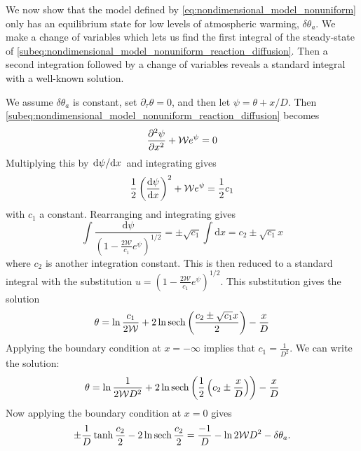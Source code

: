 We now show that the model defined by \cref{eq:nondimensional_model_nonuniform} only has an equilibrium state for low levels of atmospheric warming, $\delta\theta_a$.
We make a change of variables which lets us find the first integral of the steady-state of 
\cref{subeq:nondimensional_model_nonuniform_reaction_diffusion}. Then a second integration followed by a change of variables reveals a standard integral with a
well-known solution.

We assume $\delta\theta_a$ is constant, set $\partial_{\tau}\theta = 0$, and then let $\psi = \theta + x/D$. Then \cref{subeq:nondimensional_model_nonuniform_reaction_diffusion} becomes
\begin{equation}
  \pdv[2]{\psi}{x} + \mathcal{W}e^{\psi} = 0
\end{equation}
Multiplying this by $\dv*{\psi}{x}$ and integrating gives
\begin{equation}
  \frac{1}{2} \left(\dv{\psi}{x}\right)^2 + \mathcal{W}e^{\psi} = \frac{1}{2} c_1
\end{equation}
with $c_1$ a constant.
Rearranging and integrating gives
\begin{equation}
  \int \frac{\mathrm{d}\psi}{\left( 1 - \frac{2\mathcal{W}}{c_1} e^{\psi} \right)^{1/2}} = \pm\sqrt{c_1} \int \mathrm{d}x = c_2 \pm \sqrt{c_1} x 
\end{equation}
where $c_2$ is another integration constant. This is then reduced to a standard integral\cite{riley2006} with the substitution $u = \left(1 - \frac{2\mathcal{W}}{c_1} e^{\psi}\right)^{1/2}$.
This substitution gives the solution
\begin{equation}
  \label{eq:nondimensional_model_nonuniform_solution_general}
  \theta = \ln \frac{c_1}{2\mathcal{W}} + 2 \ln \sech \left( \frac{c_2 \pm \sqrt{c_1} x}{2}\right) - \frac{x}{D}
\end{equation}
Applying the boundary condition at $x = -\infty$ implies that $c_1 = \frac{1}{D^2}$.  We can write the solution:
\begin{equation}
  \label{eq:nondimensional_model_nonuniform_solution_one_bc}
  \theta = \ln \frac{1}{2\mathcal{W}D^2} + 2 \ln \sech \left( \frac{1}{2} \left(c_2 \pm \frac{x}{D}\right)\right) - \frac{x}{D}
\end{equation}
Now applying the boundary condition at $x = 0$ gives
\begin{equation}
  \label{eq:nondimensional_model_nonuniform_upper_boundary_condition}
  \pm\frac{1}{D}\tanh \frac{c_2}{2} - 2 \ln \sech \frac{c_2}{2} = \frac{-1}{D} - \ln 2\mathcal{W}D^2 - \delta\theta_a.
\end{equation}
